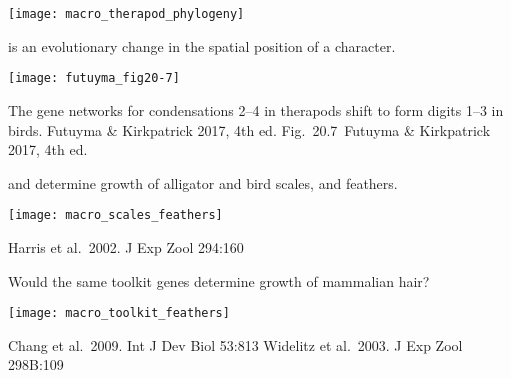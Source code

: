 \documentclass[t]{beamer}
\newcommand{\futuyma}[1]{%
	\ifthenelse{\isempty{#1}}%
	{Futuyma \& Kirkpatrick 2017, 4th ed.}%
	{Fig.~#1~Futuyma \& Kirkpatrick 2017, 4th ed.}%
}
\newcommand{\backskip}{\vspace{-0.5\baselineskip}}
\begin{document}

\begin{frame}

\centering

\texttt{[image: macro\_therapod\_phylogeny]}

\end{frame}


\begin{frame}{ is an evolutionary change in the spatial position of a character.}

{\centering

\texttt{[image: futuyma\_fig20-7]}
}

\hangpara The gene networks for condensations 2–4 in therapods shift to form digits 1–3 in birds.
\tinyfill \futuyma{20.7}

\end{frame}



\begin{frame}{ and  determine growth of alligator and bird scales, and feathers.}

\backskip

\texttt{[image: macro\_scales\_feathers]}


\tinyfill Harris et al.~2002. J Exp Zool 294:160

\end{frame}


\begin{frame}{Would the same toolkit genes determine growth of mammalian hair?}

\backskip

\texttt{[image: macro\_toolkit\_feathers]}

\vfilll

\tiny Chang et al.~2009. Int J Dev Biol 53:813
\hfill Widelitz et al.~2003. J Exp Zool 298B:109



\end{frame}



\end{document}
